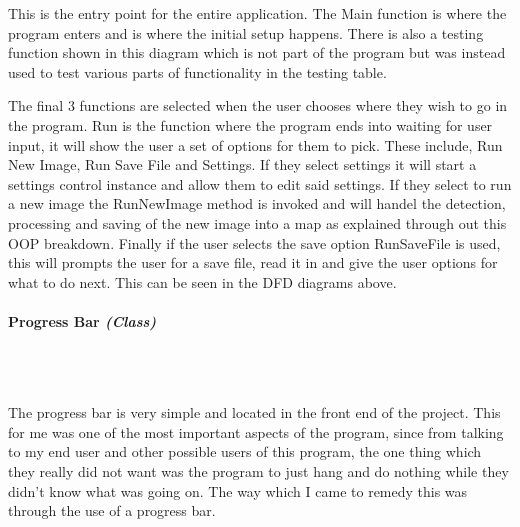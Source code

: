 \begin{FlushLeft}
    This is the entry point for the entire application. The Main function is where the program enters and is where the initial setup happens. There is also a testing function shown in this diagram which is not part of the program but was instead used to test various parts of functionality in the testing table. \\ \bk

    The final 3 functions are selected when the user chooses where they wish to go in the program. Run is the function where the program ends into waiting for user input, it will show the user a set of options for them to pick. These include, Run New Image, Run Save File and Settings. If they select settings it will start a settings control instance and allow them to edit said settings. If they select to run a new image the RunNewImage method is invoked and will handel the detection, processing and saving of the new image into a map as explained through out this OOP breakdown. Finally if the user selects the save option RunSaveFile is used, this will prompts the user for a save file, read it in and give the user options for what to do next. This can be seen in the DFD diagrams above.
    \bk

    \pagebreak
\paragraph{Progress Bar \textit{(Class)}} \mbox{} \\

    \begin{figure}[H]
        \centering
    \end{figure}\\

    The progress bar is very simple and located in the front end of the project. This for me was one of the most important aspects of the program, since from talking to my end user and other possible users of this program, the one thing which they really did not want was the program to just hang and do nothing while they didn't know what was going on. The way which I came to remedy this was through the use of a progress bar. \\ \bk


\end{FlushLeft}
